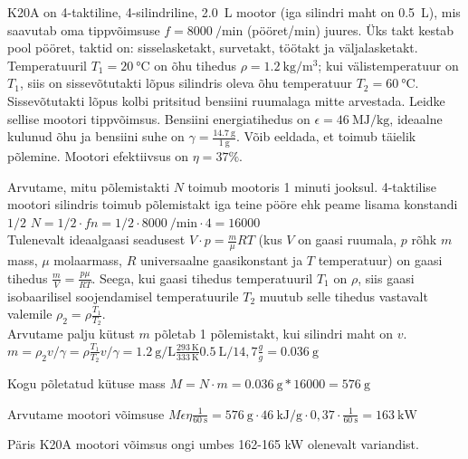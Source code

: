 
K20A on 4-taktiline, 4-silindriline, \SI{2,0}{\liter} mootor (iga silindri maht on \SI{0,5}{\liter}), mis saavutab oma tippvõimsuse $f= \SI{8000}{\per\minute}$ (pööret/min) juures. Üks takt kestab pool pööret, taktid on: sisselasketakt, survetakt, töötakt ja väljalasketakt.
Temperatuuril $T_1=\SI{20}\celsius$ on õhu tihedus $\rho=\SI{1.2}{\kg\per\m\cubed}$; kui välistemperatuur on $T_1$, siis on sissevõtutakti lõpus silindris oleva õhu temperatuur $T_2=\SI{60}\celsius$.  Sissevõtutakti lõpus kolbi pritsitud bensiini ruumalaga mitte arvestada. Leidke sellise mootori tippvõimsus.
Bensiini energiatihedus on $\epsilon = \SI{46}{\mega\joule\per\kilogram}$, ideaalne kulunud õhu ja bensiini suhe on $\gamma = \frac{\SI{14,7}{\gram}}{\SI{1}{\gram}}$. Võib eeldada, et toimub täielik põlemine. Mootori efektiivsus on $\eta=37\%$.






\hint

\solu
Arvutame, mitu põlemistakti $N$ toimub mootoris 1 minuti jooksul. 4-taktilise mootori silindris toimub põlemistakt iga teine pööre ehk peame lisama konstandi $1/2$
$N = 1/2\cdot f n = 1/2\cdot \SI{8000}{\per\minute}\cdot 4= 16000$\\
Tulenevalt ideaalgaasi seadusest $V \cdot p = \frac{m}{\mu}RT$ (kus $V$ on gaasi ruumala, $p$ rõhk $m$ mass, $\mu$ molaarmass, $R$ universaalne gaasikonstant ja $T$ temperatuur) on gaasi tihedus $\frac{m}{V} = \frac{p\mu}{RT}$. Seega, kui gaasi tihedus temperatuuril $T_1$ on $\rho$, siis gaasi isobaarilisel soojendamisel temperatuurile $T_2$ muutub selle tihedus vastavalt valemile $\rho_2 = \rho \frac{T_1}{T_2}$. \\
Arvutame palju kütust $m$ põletab 1 põlemistakt, kui silindri maht on $v$.
$m = \rho_2v /\gamma  = \rho \frac{T_1}{T_2}v /\gamma  = \SI{1,2}{\gram\per\liter} \frac{\SI{293}{\kelvin}}{\SI{333}{\kelvin}} \SI{0,5}{\liter} / 14,7 \frac{g}{g} = \SI{0,036}{\gram}$

Kogu põletatud kütuse mass $M = N\cdot m = \SI{0,036}{\gram} * 16000 = \SI{576}{\gram}$

Arvutame mootori võimsuse  
$M \epsilon \eta \frac{1}{\SI{60}{\second}} = \SI{576}{\gram}\cdot\SI{46}{\kilo\joule\per\gram}\cdot 0,37\cdot \frac{1}{\SI{60}{\second}}=\SI{163}{\kilo\watt}$ 

Päris K20A mootori võimsus ongi umbes 162-165 kW olenevalt variandist.
\probend